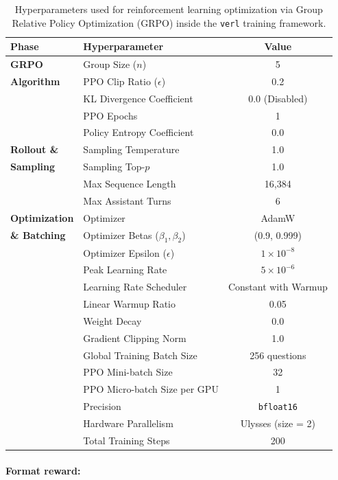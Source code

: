 \documentclass{llmxive}
\begin{document}
\begin{table}[!t]
\centering
\begin{tabular}{llc}
\toprule
\textbf{Phase} & \textbf{Hyperparameter} & \textbf{Value} \\
\midrule
\textbf{GRPO} 
& Group Size ($n$) & 5 \\
\textbf{Algorithm} 
& PPO Clip Ratio ($\epsilon$) & 0.2 \\
& KL Divergence Coefficient & 0.0 (Disabled) \\
& PPO Epochs & 1 \\
& Policy Entropy Coefficient & 0.0 \\
\midrule
\textbf{Rollout \&} 
& Sampling Temperature & 1.0 \\
\textbf{Sampling} 
& Sampling Top-$p$ & 1.0 \\
& Max Sequence Length & 16,384 \\
& Max Assistant Turns & 6 \\
\midrule
\textbf{Optimization} 
& Optimizer & AdamW \\
\textbf{\& Batching} 
& Optimizer Betas ($\beta_1, \beta_2$) & (0.9, 0.999) \\
& Optimizer Epsilon ($\epsilon$) & $1 \times 10^{-8}$ \\
& Peak Learning Rate & $5 \times 10^{-6}$ \\
& Learning Rate Scheduler & Constant with Warmup \\
& Linear Warmup Ratio & 0.05 \\
& Weight Decay & 0.0 \\
& Gradient Clipping Norm & 1.0 \\
& Global Training Batch Size & 256 questions \\
& PPO Mini-batch Size & 32 \\
& PPO Micro-batch Size per GPU & 1 \\
& Precision & \texttt{bfloat16} \\
& Hardware Parallelism & Ulysses (size = 2) \\
& Total Training Steps & 200 \\
\bottomrule
\end{tabular}
\caption{Hyperparameters used for reinforcement learning optimization via Group Relative Policy Optimization (GRPO) inside the \texttt{verl} training framework.}
\label{tab:hyperparams-grpo}
\end{table}



\paragraph{Format reward:}
\end{document}
